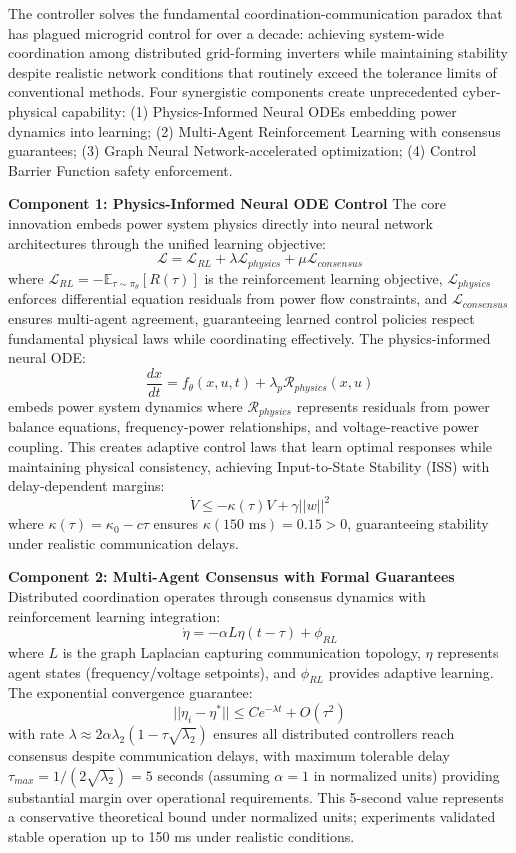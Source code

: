 \documentclass[12pt]{article}
\begin{document}
The controller solves the fundamental coordination-communication paradox that has plagued microgrid control for over a decade: achieving system-wide coordination among distributed grid-forming inverters while maintaining stability despite realistic network conditions that routinely exceed the tolerance limits of conventional methods. Four synergistic components create unprecedented cyber-physical capability: (1) Physics-Informed Neural ODEs embedding power dynamics into learning; (2) Multi-Agent Reinforcement Learning with consensus guarantees; (3) Graph Neural Network-accelerated optimization; (4) Control Barrier Function safety enforcement.

\textbf{Component 1: Physics-Informed Neural ODE Control}
The core innovation embeds power system physics directly into neural network architectures through the unified learning objective:
$$\mathcal{L} = \mathcal{L}_{RL} + \lambda \mathcal{L}_{physics} + \mu \mathcal{L}_{consensus}$$
where $\mathcal{L}_{RL} = -\mathbb{E}_{\tau \sim \pi_\theta}[R(\tau)]$ is the reinforcement learning objective, $\mathcal{L}_{physics}$ enforces differential equation residuals from power flow constraints, and $\mathcal{L}_{consensus}$ ensures multi-agent agreement, guaranteeing learned control policies respect fundamental physical laws while coordinating effectively. The physics-informed neural ODE:
$$\frac{dx}{dt} = f_\theta(x, u, t) + \lambda_p \mathcal{R}_{physics}(x, u)$$
embeds power system dynamics where $\mathcal{R}_{physics}$ represents residuals from power balance equations, frequency-power relationships, and voltage-reactive power coupling. This creates adaptive control laws that learn optimal responses while maintaining physical consistency, achieving Input-to-State Stability (ISS) with delay-dependent margins:
$$\dot{V} \leq -\kappa(\tau)V + \gamma||w||^2$$
where $\kappa(\tau) = \kappa_0 - c\tau$ ensures $\kappa(150\text{ ms}) = 0.15 > 0$, guaranteeing stability under realistic communication delays.

\textbf{Component 2: Multi-Agent Consensus with Formal Guarantees}
Distributed coordination operates through consensus dynamics with reinforcement learning integration:
$$\dot{\eta} = -\alpha L \eta(t-\tau) + \phi_{RL}$$
where $L$ is the graph Laplacian capturing communication topology, $\eta$ represents agent states (frequency/voltage setpoints), and $\phi_{RL}$ provides adaptive learning. The exponential convergence guarantee:
$$||\eta_i - \eta^*|| \leq Ce^{-\lambda t} + O(\tau^2)$$
with rate $\lambda \approx 2\alpha\lambda_2(1 - \tau\sqrt{\lambda_2})$ ensures all distributed controllers reach consensus despite communication delays, with maximum tolerable delay $\tau_{max} = 1/(2\sqrt{\lambda_2}) = 5$ seconds (assuming $\alpha = 1$ in normalized units) providing substantial margin over operational requirements. This 5-second value represents a conservative theoretical bound under normalized units; experiments validated stable operation up to 150 ms under realistic conditions.
\end{document}
